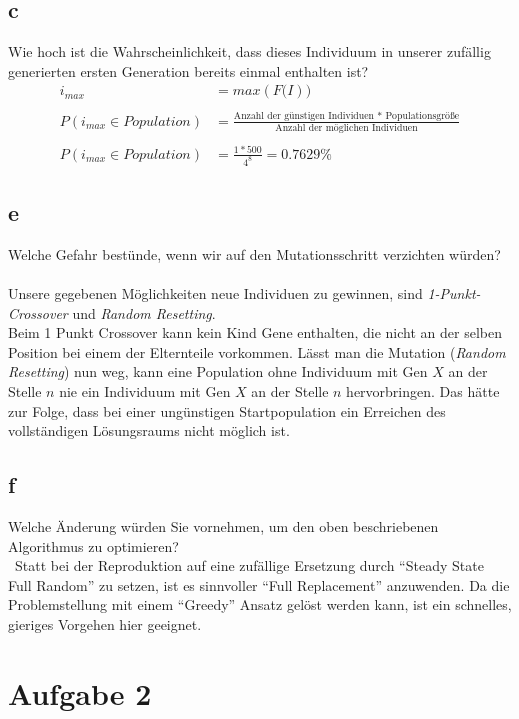\documentclass[12pt, a4paper]{article}
\begin{document}
\subsection*{c}
Wie hoch ist die Wahrscheinlichkeit, dass dieses Individuum in unserer zufällig generierten ersten Generation bereits einmal enthalten ist?\\
\begin{align*}
i_{max} &= max(F\mathbb(I)) \\\\
P(i_{max}\in Population) &= \frac{\text{Anzahl der günstigen Individuen * Populationsgröße}}{\text{Anzahl der möglichen Individuen}} \\\\
P(i_{max}\in Population) &= \frac{1*500}{4^8} = 0.7629\%
\end{align*}

\subsection*{e}
Welche Gefahr bestünde, wenn wir auf den Mutationsschritt verzichten würden?\\\\
Unsere gegebenen Möglichkeiten neue Individuen zu gewinnen, sind \textit{1-Punkt-Crossover} und \textit{Random Resetting}.\\
Beim 1 Punkt Crossover kann kein Kind Gene enthalten, die nicht an der selben Position bei einem der Elternteile vorkommen. Lässt man die Mutation (\textit{Random Resetting}) nun weg, kann eine Population ohne Individuum mit Gen $X$ an der Stelle $n$ nie ein Individuum mit Gen $X$ an der Stelle $n$ hervorbringen. Das hätte zur Folge, dass bei einer ungünstigen Startpopulation ein Erreichen des vollständigen Lösungsraums nicht möglich ist.

\subsection*{f}
Welche Änderung würden Sie vornehmen, um den oben beschriebenen Algorithmus zu optimieren?\\\
Statt bei der Reproduktion auf eine zufällige Ersetzung durch ``Steady
State Full Random'' zu setzen, ist es sinnvoller ``Full Replacement''
anzuwenden. Da die Problemstellung mit einem ``Greedy'' Ansatz gelöst
werden kann, ist ein schnelles, gieriges Vorgehen hier geeignet.

\newpage

\section*{Aufgabe 2}
\end{document}
